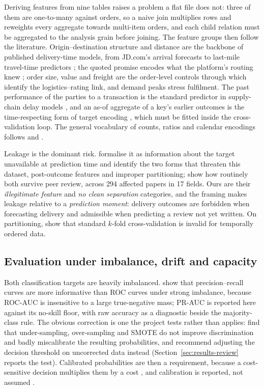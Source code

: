 Deriving features from nine tables raises a problem a flat file does not: three
of them are one-to-many against orders, so a naive join multiplies rows and
reweights every aggregate towards multi-item orders, and each child relation
must be aggregated to the analysis grain before joining. The feature groups then
follow the literature. Origin--destination structure and distance are the
backbone of published delivery-time models, from JD.com's arrival forecasts
\citep{salari2022delivery} to last-mile travel-time predictors
\citep{liu2021lastmile}; the quoted promise encodes what the platform's routing
knew \citep{cui2024promise}; order size, value and freight are the order-level
controls through which \citet{deshpande2023logistics} identify the
logistics--rating link, and demand peaks stress fulfilment. The past performance
of the parties to a transaction is the standard predictor in supply-chain delay
models \citep{baryannis2019risk}, and an as-of aggregate of a key's earlier
outcomes is the time-respecting form of target encoding
\citep{miccibarreca2001target}, which must be fitted inside the
cross-validation loop. The general vocabulary of counts, ratios and calendar
encodings follows \citet{kuhn2019feature} and \citet{heaton2016feature}.

Leakage is the dominant risk. \citet{kaufman2012leakage} formalise it as
information about the target unavailable at prediction time and identify the two
forms that threaten this dataset, post-outcome features and improper
partitioning; \citet{kapoor2023leakage} show how routinely both survive peer
review, across 294 affected papers in 17 fields. Ours are their
\emph{illegitimate feature} and \emph{no clean separation} categories, and the
framing makes leakage relative to a \emph{prediction moment}: delivery outcomes
are forbidden when forecasting delivery and admissible when predicting a review
not yet written. On partitioning, \citet{bergmeir2012cv} show that standard
$k$-fold cross-validation is invalid for temporally ordered data.

\subsection{Evaluation under imbalance, drift and capacity}

Both classification targets are heavily imbalanced. \citet{saito2015prplot}
show that precision--recall curves are more informative than ROC curves under
strong imbalance, because ROC-AUC is insensitive to a large true-negative mass;
PR-AUC is reported here against its no-skill floor, with raw accuracy as a
diagnostic beside the majority-class rule. The obvious correction is one the
project tests rather than applies: \citet{goorbergh2022imbalance} find that
under-sampling, over-sampling and SMOTE \citep{chawla2002smote} do not improve
discrimination and badly miscalibrate the resulting probabilities, and recommend
adjusting the decision threshold on uncorrected data instead
(Section~\ref{sec:results-review} reports the test). Calibrated probabilities
are then a requirement, because a cost-sensitive decision multiplies them by a
cost \citep{elkan2001cost}, and calibration is reported, not assumed
\citep{niculescu2005calibration, platt1999probabilistic}.

